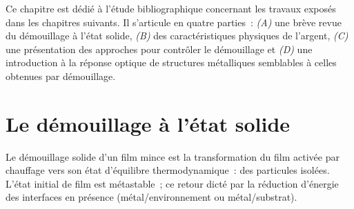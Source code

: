\newpage\null\thispagestyle{empty}\newpage
\setcounter{minitocdepth}{2}
\minitoc
\setcounter{minitocdepth}{3}
\newpage

Ce chapitre est dédié à l'étude bibliographique concernant les travaux exposés dans les chapitres suivants. Il s'articule en quatre parties~: \textit{(A)} une brève revue du démouillage à l'état solide, \textit{(B)} des caractéristiques physiques de l'argent, \textit{(C)} une présentation des approches pour contrôler le démouillage et \textit{(D)} une introduction à la réponse optique de structures métalliques semblables à celles obtenues par démouillage.


\section{Le démouillage à l'état solide}
Le démouillage solide d'un film mince est la transformation du film activée par chauffage vers son état d'équilibre thermodynamique~: des particules isolées. L'état initial de film est métastable~; ce retour dicté par la réduction d'énergie des interfaces en présence (métal/environnement ou métal/substrat).\par 
